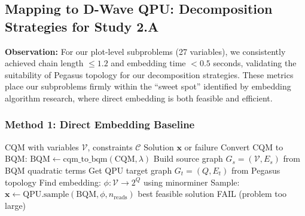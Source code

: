 \documentclass{oqireport}
\begin{document}

\subsection{Mapping to D-Wave QPU: Decomposition Strategies for Study 2.A}
\label{appx:decomp}

\textbf{Observation:} For our plot-level subproblems (27 variables), we consistently achieved chain length $\leq 1.2$ and embedding time $<0.5$ seconds, validating the suitability of Pegasus topology for our decomposition strategies. These metrics place our subproblems firmly within the ``sweet spot'' identified by embedding algorithm research, where direct embedding is both feasible and efficient.

\subsubsection{Method 1: Direct Embedding Baseline}

\begin{algorithm}
\caption{Direct QPU Embedding}
\begin{algorithmic}[1]
\Require CQM with variables $\mathcal{V}$, constraints $\mathcal{C}$
\Ensure Solution $\mathbf{x}$ or failure
\State Convert CQM to BQM: $\text{BQM} \leftarrow \text{cqm\_to\_bqm}(\text{CQM}, \lambda)$
\State Build source graph $G_s = (\mathcal{V}, E_s)$ from BQM quadratic terms
\State Get QPU target graph $G_t = (Q, E_t)$ from Pegasus topology
\State Find embedding: $\phi: \mathcal{V} \rightarrow 2^Q$ using minorminer
    \State Sample: $\mathbf{x} \leftarrow \text{QPU.sample}(\text{BQM}, \phi, n_{\text{reads}})$
    \State \Return best feasible solution
\Else
    \State \Return FAIL (problem too large)
\EndIf
\end{algorithmic}
\end{algorithm}
\end{document}
